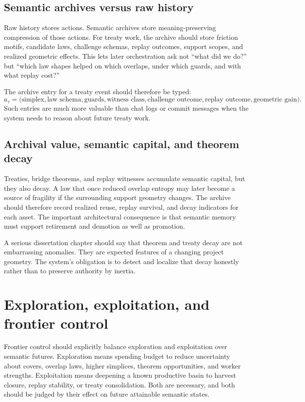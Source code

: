 \documentclass[11pt]{report}
\begin{document}
\section{Semantic archives versus raw history}
Raw history stores actions. Semantic archives store meaning-preserving compression of those actions. For treaty work, the archive should store friction motifs, candidate laws, challenge schemas, replay outcomes, support scopes, and realized geometric effects. This lets later orchestration ask not ``what did we do?'' but ``which law shapes helped on which overlaps, under which guards, and with what replay cost?''

The archive entry for a treaty event should therefore be typed:
\[
a_\tau
=
\bigl(
\text{simplex},
\text{law schema},
\text{guards},
\text{witness class},
\text{challenge outcome},
\text{replay outcome},
\text{geometric gain}
\bigr).
\]
Such entries are much more valuable than chat logs or commit messages when the system needs to reason about future treaty work.

\section{Archival value, semantic capital, and theorem decay}
Treaties, bridge theorems, and replay witnesses accumulate semantic capital, but they also decay. A law that once reduced overlap entropy may later become a source of fragility if the surrounding support geometry changes. The archive should therefore record realized reuse, replay survival, and decay indicators for each asset. The important architectural consequence is that semantic memory must support retirement and demotion as well as promotion.

A serious dissertation chapter should say that theorem and treaty decay are not embarrassing anomalies. They are expected features of a changing project geometry. The system's obligation is to detect and localize that decay honestly rather than to preserve authority by inertia.

\chapter{Exploration, exploitation, and frontier control}
Frontier control should explicitly balance exploration and exploitation over semantic futures. Exploration means spending budget to reduce uncertainty about covers, overlap laws, higher simplices, theorem opportunities, and worker strengths. Exploitation means deepening a known productive basin to harvest closure, replay stability, or treaty consolidation. Both are necessary, and both should be judged by their effect on future attainable semantic states.
\end{document}
